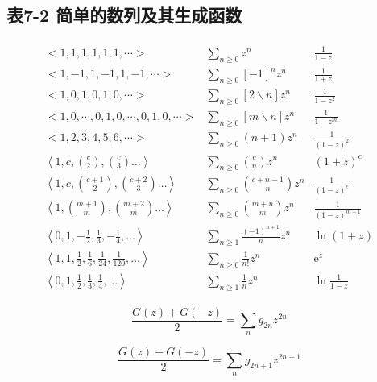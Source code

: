 \subsection{表7-2 简单的数列及其生成函数}
\begin{align*}
    \begin{array}{lcc}
        <1,1,1,1,1,1, \cdots>                       & \sum_{n \ge 0} z^{n}                 & \frac{1}{1-z}       \\
        <1,-1,1,-1,1,-1, \cdots>                    & \sum_{n \ge 0}[-1]^{n} z^{n}         & \frac{1}{1+z}       \\
        <1,0,1,0,1,0, \cdots>                       & \sum_{n \ge 0}[2 \backslash n] z^{n} & \frac{1}{1-z^{2}}   \\
        <1,0, \cdots, 0,1,0, \cdots, 0,1,0, \cdots> & \sum_{n \ge 0}[m \backslash n] z^{n} & \frac{1}{1-z^{m}}   \\
        <1,2,3,4,5,6, \cdots>                       & \sum_{n \ge 0}(n+1) z^{n}            & \frac{1}{(1-z)^{2}} \\
        \left\langle 1, c, {c \choose 2}, {c \choose 3} \dots \right\rangle & \sum_{n \ge 0} {c \choose n} z^{n}    & (1+z)^c\\
        \left\langle 1, c, {c+1 \choose 2}, {c+2 \choose 3} \dots \right\rangle & \sum_{n \ge 0} {c+n-1 \choose n} z^{n}    & \frac{1}{(1-z)^c}\\
        \left\langle 1, {m+1 \choose m}, {m+2 \choose m} \dots \right\rangle & \sum_{n \ge 0} {m+n \choose m} z^{n}    & \frac{1}{(1-z)^{m+1}}\\
        \left\langle 0,1,-\frac{1}{2}, \frac{1}{3},-\frac{1}{4}, \ldots\right\rangle & \sum_{n \ge 1} \frac{(-1)^{n+1}}{n} z^{n} & \ln (1+z) \\
        \left\langle 1,1, \frac{1}{2}, \frac{1}{6}, \frac{1}{24}, \frac{1}{120}, \ldots\right\rangle & \sum_{n \ge 0} \frac{1}{n !} z^{n} & \mathrm{e}^{z}\\
        \left\langle 0,1, \frac{1}{2}, \frac{1}{3}, \frac{1}{4}, \ldots\right\rangle & \sum_{n \ge 1} \frac{1}{n} z^{n} & \ln \frac{1}{1-z}
\end{array}
\end{align*}

\begin{equation}
    \frac{G(z)+G(-z)}{2}=\sum_{n} g_{2 n} z^{2 n}
\end{equation}

\begin{equation}
    \frac{G(z)-G(-z)}{2}=\sum_{n} g_{2 n+1} z^{2 n+1}
\end{equation}

